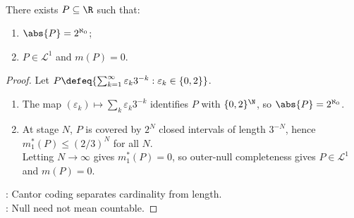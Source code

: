\begin{corollary} \label{cor:uncountable-lebesgue-null-sets} \\
There exists $P\subseteq\R$ such that:
\begin{enumerate}[label=(\roman*)]
\setlength{\itemsep}{0pt}
\item $\abs{P}=2^{\aleph_0}$;
\item $P\in\mathcal{L}^1$ and $m(P)=0$.
\end{enumerate}
\begin{proof}
Let $P\defeq\{\sum_{k=1}^{\infty}\varepsilon_k3^{-k}:\varepsilon_k\in\{0,2\}\}$.
\begin{enumerate}[label=(\roman*)]
\setlength{\itemsep}{0pt}
\item The map $(\varepsilon_k)\mapsto\sum_k\varepsilon_k3^{-k}$ identifies $P$ with $\{0,2\}^{\N}$, so $\abs{P}=2^{\aleph_0}$.
\item At stage $N$, $P$ is covered by $2^N$ closed intervals of length $3^{-N}$, hence $m_1^\ast(P)\leq(2/3)^N$ for all $N$.\\
Letting $N\to\infty$ gives $m_1^\ast(P)=0$, so outer-null completeness gives $P\in\mathcal{L}^1$ and $m(P)=0$.
\end{enumerate}
: Cantor coding separates cardinality from length.\\
: Null need not mean countable.
\end{proof}
\end{corollary}

